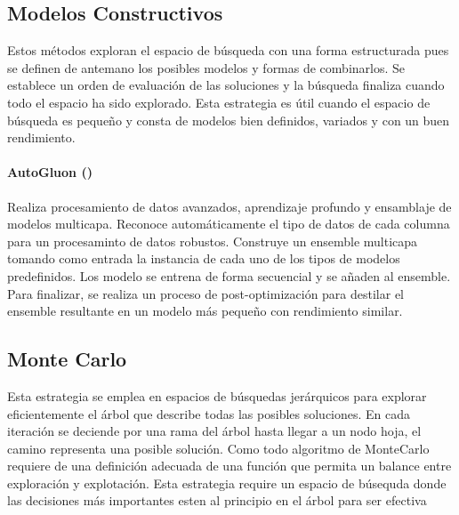 

\subsection{Modelos Constructivos}
Estos m\'etodos exploran el espacio de b\'usqueda con una forma estructurada pues se definen de antemano los posibles modelos y formas de combinarlos. Se establece un orden de evaluaci\'on de las soluciones y la b\'usqueda finaliza cuando todo el espacio ha sido explorado. Esta estrategia es \'util cuando el espacio de b\'usqueda es peque\~no y consta de modelos bien definidos, variados y con un buen rendimiento.

\paragraph{AutoGluon (\cite{erickson2020autogluon})} Realiza procesamiento de datos avanzados, aprendizaje profundo y ensamblaje de modelos multicapa. Reconoce autom\'aticamente el tipo de datos de cada columna para un procesaminto de datos robustos. Construye un ensemble multicapa  tomando como entrada la instancia de cada uno de los tipos de modelos predefinidos. Los modelo se entrena de forma secuencial y se a\~naden al ensemble. Para finalizar, se realiza un proceso de post-optimizaci\'on para destilar el ensemble resultante en un modelo m\'as peque\~no con rendimiento similar.

\subsection{Monte Carlo}
 Esta estrategia se emplea en espacios de b\'usquedas jer\'arquicos para explorar eficientemente el \'arbol que describe todas las  posibles soluciones. En cada iteraci\'on se deciende por una rama del \'arbol hasta llegar a un nodo hoja, el camino representa una posible soluci\'on. Como todo algoritmo de MonteCarlo requiere de una definici\'on adecuada de una funci\'on que permita un balance entre exploraci\'on y explotaci\'on. Esta estrategia require un espacio de b\'usequda donde las decisiones m\'as importantes esten al principio en el \'arbol para ser efectiva

